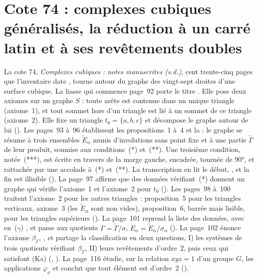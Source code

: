 \section[Cote 74 : complexes cubiques généralisés, la réduction à un carré latin et à ses revêtements doubles]{Cote 74 : complexes cubiques généralisés, la réduction à un carré latin et à ses revêtements doubles\protect{}}\label{sec:74}

La cote 74, \emph{Complexes cubiques : notes manuscrites (s.d.)}, cent trente-cinq pages que l'inventaire date \q{[à partir de 1976]}, tourne autour du graphe des vingt-sept droites d'une surface cubique. La liasse qui commence page~92 porte le titre . Elle pose deux axiomes sur un graphe $S$ : toute arête est contenue dans un unique triangle (axiome~1), et tout sommet hors d'un triangle est lié à un sommet de ce triangle (axiome~2). Elle fixe un triangle $t_0 = \{a, b, c\}$ et décompose le graphe autour de lui (). Les pages~93 à~96 établissent les propositions~1 à~4 et la  : le graphe se résume à trois ensembles $\widetilde E_\alpha$ munis d'involutions sans point fixe et à une partie $\widetilde\Gamma$ de leur produit, soumise aux conditions~(*) et~(**). Une troisième condition, notée~(***), est écrite en travers de la marge gauche, encadrée, tournée de 90°, et rattachée par une accolade à~(*) et~(**). La transcription en lit le début, , et la fin est illisible (). La page~97 affirme que des données vérifiant~(*) donnent un graphe qui vérifie l'axiome~1 et l'axiome~2 pour $t_0$ (). Les pages~98 à~100 traitent l'axiome~2 pour les autres triangles : proposition~5 pour les triangles verticaux, axiome~3 (les $\widetilde E_\alpha$ sont non vides), proposition~6, barrée mais lisible, pour les triangles supérieurs (). La page~101 reprend la liste des données, avec en~($\gamma$) , et passe aux quotients $\Gamma = \widetilde\Gamma/\sigma$, $E_\alpha = \widetilde E_\alpha/\sigma_\alpha$ (). La page~102 énonce l'axiome $\beta_\Gamma$, , et partage la classification en deux questions, I) les systèmes de trois quotients vérifiant $\beta_\Gamma$, II) leurs revêtements d'ordre~2, puis ceux qui satisfont (Ka) (, ). La page~116 étudie, sur la relation $xyz = 1$ d'un groupe $G$, les applications $\varphi_a$ et conclut que tout élément est d'ordre~2 ().

